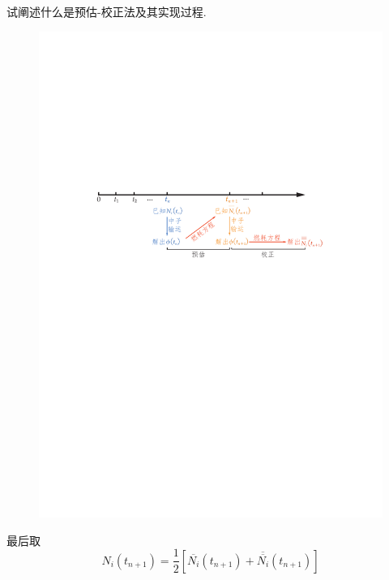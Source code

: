 \begin{exercise}
    试阐述什么是预估-校正法及其实现过程.\,
    \begin{solution}
        \begin{figure}[H]
            \centering
            \includegraphics[scale=0.8]{figures/fig6.3.pdf}
        \end{figure}
    最后取
    \begin{equation*}
        N_i(t_{n+1}) = \frac{1}{2} \left[\overline{N_i}(t_{n+1}) + \overline{\overline{N_i}}(t_{n+1})\right]
    \end{equation*}
    \end{solution}
\end{exercise}

